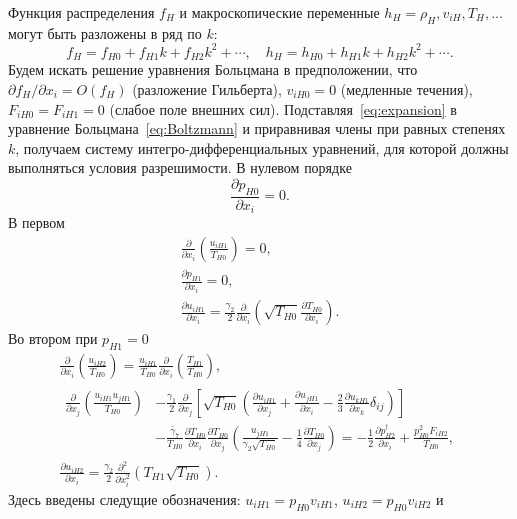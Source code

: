 \documentclass[
aps,%
12pt,%
final,%
notitlepage,%
oneside,%
onecolumn,%
nobibnotes,%
nofootinbib,%
superscriptaddress,%
noshowpacs,%
showkeys,%
floatfix,%
tightenlines,%
centertags]%
{revtex4}
\newcommand{\pder}[2][]{\frac{\partial#1}{\partial#2}}
\newcommand{\pderdual}[2][]{\frac{\partial^2#1}{\partial#2^2}}
\newcommand{\Pder}[2][]{\partial#1/\partial#2}
\newcommand{\OO}[1]{O(#1)}
\begin{document}
Функция распределения \(f_H\) и макроскопические переменные \(h_H = \rho_H, v_{iH}, T_H, \dots\)
могут быть разложены в ряд по \(k\):
\begin{equation}\label{eq:expansion}
    f_H = f_{H0} + f_{H1}k + f_{H2}k^2 + \cdots, \quad h_H = h_{H0} + h_{H1}k + h_{H2}k^2 + \cdots.
\end{equation}
Будем искать решение уравнения Больцмана в предположении,
что \(\Pder[f_H]{x_i} = \OO{f_H}\) (разложение Гильберта),
\(v_{iH0} = 0\) (медленные течения), \(F_{iH0} = F_{iH1} = 0\) (слабое поле внешних сил).
Подставляя~\eqref{eq:expansion} в уравнение Больцмана~\eqref{eq:Boltzmann} и приравнивая члены
при равных степенях \(k\), получаем систему интегро-дифференциальных уравнений,
для которой должны выполняться условия разрешимости. В нулевом порядке
\begin{equation}
    \pder[p_{H0}]{x_i} = 0. \label{eq:asymptotic0_p}
\end{equation}
В первом
\begin{gather}
    \pder{x_i}\left(\frac{u_{iH1}}{T_{H0}}\right) = 0, \label{eq:asymptotic1_u} \\
    \pder[p_{H1}]{x_i} = 0, \label{eq:asymptotic1_p} \\
    \pder[u_{iH1}]{x_i} = \frac{\gamma_2}2\pder{x_i}\left(\sqrt{T_{H0}}\pder[T_{H0}]{x_i}\right). \label{eq:asymptotic1_T}
\end{gather}
Во втором при \(p_{H1} = 0\)
\begin{gather}
    \pder{x_i}\left(\frac{u_{iH2}}{T_{H0}}\right)
        = \frac{u_{iH1}}{T_{H0}}\pder{x_i}\left(\frac{T_{H1}}{T_{H0}}\right), \label{eq:asymptotic2_u} \\
    \begin{aligned}
        \pder{x_j}\left(\frac{u_{iH1}u_{jH1}}{T_{H0}}\right)
        &-\frac{\gamma_1}2\pder{x_j}\left[\sqrt{T_{H0}}\left(
            \pder[u_{iH1}]{x_j} + \pder[u_{jH1}]{x_i} - \frac23\pder[u_{kH1}]{x_k}\delta_{ij}
        \right)\right] \\
        &- \frac{\bar{\gamma}_7}{T_{H0}}\pder[T_{H0}]{x_i}\pder[T_{H0}]{x_j}\left(\frac{u_{jH1}}{\gamma_2\sqrt{T_{H0}}} - \frac{1}4\pder[T_{H0}]{x_j}\right)
        = -\frac12\pder[p_{H2}^\dag]{x_i} + \frac{p_{H0}^2 F_{iH2}}{T_{H0}},
    \end{aligned} \label{eq:asymptotic2_p} \\
    \pder[u_{iH2}]{x_i} = \frac{\gamma_2}2\pderdual{x_i}\left(T_{H1}\sqrt{T_{H0}}\right). \label{eq:asymptotic2_T}
\end{gather}
Здесь введены следущие обозначения: \(u_{iH1} = p_{H0}v_{iH1}\), \(u_{iH2} = p_{H0}v_{iH2}\) и
\end{document}
